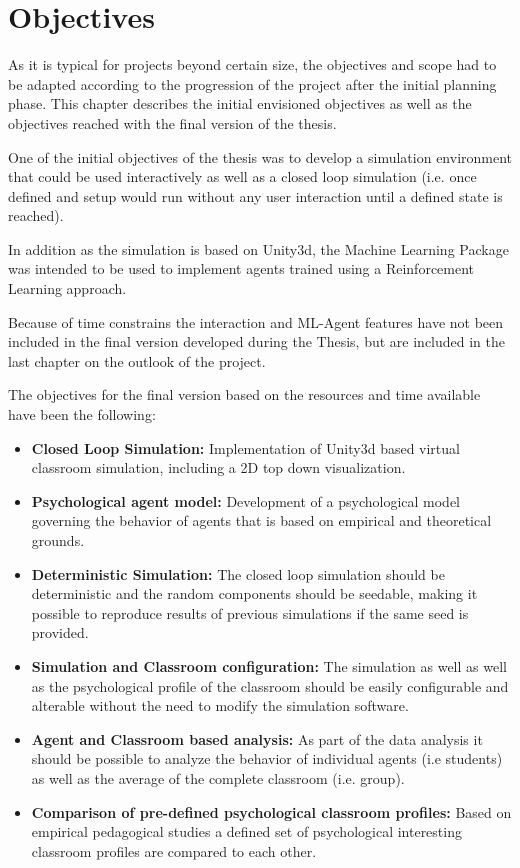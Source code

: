 \chapter{Objectives}
As it is typical for projects beyond certain size, the objectives and scope had to
be adapted according to the progression of the project after the initial planning phase.
This chapter describes the initial envisioned objectives as well as the objectives
reached with the final version of the thesis.

One of the initial objectives of the thesis was to develop a simulation environment that
could be used interactively as well as a closed loop simulation (i.e. once defined
and setup would run without any user interaction until a defined state is reached).

In addition as the simulation is based on Unity3d, the Machine Learning Package
was intended to be used to implement agents trained using a Reinforcement Learning approach.

Because of time constrains the interaction and ML-Agent features have not been included
in the final version developed during the Thesis, but are included in the last chapter
on the outlook of the project.

\bb

The objectives for the final version based on the resources and time available
have been the following:

\begin{itemize}
    \item \textbf{Closed Loop Simulation:} Implementation of Unity3d based virtual
    classroom simulation, including a 2D top down visualization.
    \item \textbf{Psychological agent model:} Development of a psychological model
    governing the behavior of agents that is based on empirical and theoretical grounds.
    \item \textbf{Deterministic Simulation:} The closed loop simulation should be
    deterministic and the random components should be seedable, making it possible
    to reproduce results of previous simulations if the same seed is provided.
    \item \textbf{Simulation and Classroom configuration:} The simulation as well
    as well as the psychological profile of the classroom should be easily configurable
    and alterable without the need to modify the simulation software.
    \item \textbf{Agent and Classroom based analysis:} As part of the data analysis
    it should be possible to analyze the behavior of individual agents (i.e students)
    as well as the average of the complete classroom (i.e. group).
    \item \textbf{Comparison of pre-defined psychological classroom profiles:} Based
    on empirical pedagogical studies a defined set of psychological interesting classroom
    profiles are compared to each other.
\end{itemize}

